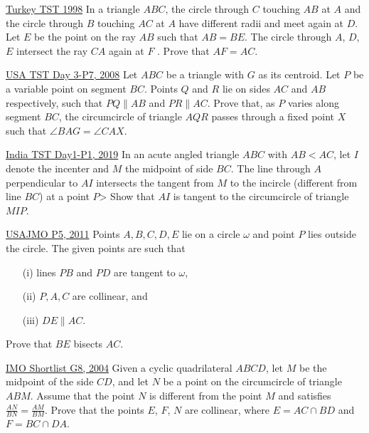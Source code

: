 \begin{problem}{9}{\href{https://artofproblemsolving.com/community/q2h449171p35492771}{Turkey TST 1998}} 
	In a triangle $ABC$, the circle through $C$ touching $AB$ at $A$ and the circle through $B$ touching $AC$ at $A$ have diﬀerent radii and meet again at $D$. Let $E$ be the point on the ray $AB$ such that $AB = BE$. The circle through $A$, $D$, $E$ intersect the ray $CA$ again at $F$ . Prove that $AF = AC$.
\end{problem}

\begin{problem}{10}{\href{https://artofproblemsolving.com/community/q2h224628p35453908}{USA TST Day 3-P7, 2008}} 
	Let $ ABC$ be a triangle with $ G$ as its centroid. Let $ P$ be a variable point on segment $ BC$. Points $ Q$ and $ R$ lie on sides $ AC$ and $ AB$ respectively, such that $ PQ \parallel AB$ and $ PR \parallel AC$. Prove that, as $ P$ varies along segment $ BC$, the circumcircle of triangle $ AQR$ passes through a fixed point $ X$ such that $ \angle BAG = \angle CAX$.
\end{problem}

\begin{problem}{11}{\href{https://artofproblemsolving.com/community/q2h1876785p35453764}{India TST Day1-P1, 2019}} 
	In an acute angled triangle $ABC$ with $AB < AC$, let $I$ denote the incenter and $M$ the midpoint of side $BC$. The line through $A$ perpendicular to $AI$ intersects the tangent from $M$ to the incircle (different from line $BC$) at a point $P$> Show that $AI$ is tangent to the circumcircle of triangle $MIP$.
\end{problem}

\begin{problem}{12}{\href{https://artofproblemsolving.com/community/q1h404355p35105708}{USAJMO P5, 2011}} 
	Points $A,B,C,D,E$ lie on a circle $\omega$ and point $P$ lies outside the circle. The given points are such that 
	\begin{itemize}
		\item [(i)] lines $PB$ and $PD$ are tangent to $\omega$,
		\item [(ii)] $P, A, C$ are collinear, and 
		\item[(iii)] $DE \parallel AC$.
	\end{itemize}
	Prove that $BE$ bisects $AC$.
\end{problem}

\begin{problem}{13}{\href{https://artofproblemsolving.com/community/c6h39093p243438}{IMO Shortlist G8, 2004}} 
	Given a cyclic quadrilateral $ABCD$, let $M$ be the midpoint of the side $CD$, and let $N$ be a point on the circumcircle of triangle $ABM$. Assume that the point $N$ is different from the point $M$ and satisfies $\frac{AN}{BN}=\frac{AM}{BM}$. Prove that the points $E$, $F$, $N$ are collinear, where $E=AC\cap BD$ and $F=BC\cap DA$.
\end{problem}

